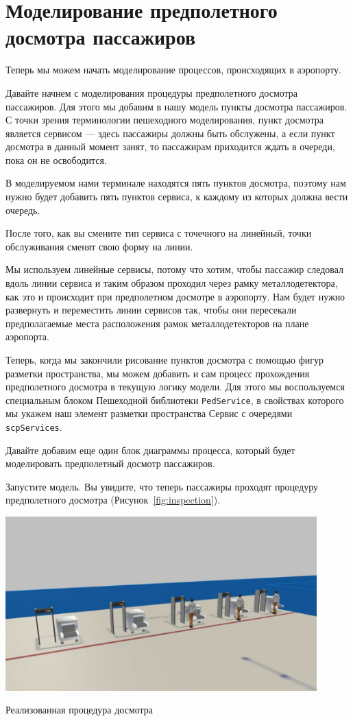 \section{Моделирование предполетного досмотра пассажиров}
Теперь мы можем начать моделирование процессов, происходящих в
аэропорту.\par
Давайте начнем с моделирования процедуры предполетного досмотра
пассажиров. Для этого мы добавим в нашу модель пункты досмотра пассажиров.
С точки зрения терминологии пешеходного моделирования, пункт досмотра
является сервисом --- здесь пассажиры должны быть обслужены, а если пункт
досмотра в данный момент занят, то пассажирам приходится ждать в очереди,
пока он не освободится.\par
В моделируемом нами терминале находятся пять пунктов досмотра, поэтому
нам нужно будет добавить пять пунктов сервиса, к каждому из которых должна
вести очередь.\par
После того, как вы смените тип сервиса с точечного на линейный, точки
обслуживания сменят свою форму на линии.\par
Мы используем линейные сервисы, потому что хотим, чтобы пассажир следовал
вдоль линии сервиса и таким образом проходил через рамку металлодетектора,
как это и происходит при предполетном досмотре в аэропорту. Нам будет нужно
развернуть и переместить линии сервисов так, чтобы они пересекали
предполагаемые места расположения рамок металлодетекторов на плане
аэропорта.\par
Теперь, когда мы закончили рисование пунктов досмотра с помощью фигур
разметки пространства, мы можем добавить и сам процесс прохождения
предполетного досмотра в текущую логику модели. Для этого мы воспользуемся
специальным блоком Пешеходной библиотеки \texttt{PedService}, в свойствах
которого мы укажем наш элемент разметки пространства Сервис с очередями
\texttt{scpServices}.\par
Давайте добавим еще один блок диаграммы процесса, который будет
моделировать предполетный досмотр пассажиров.\par
Запустите модель. Вы увидите, что теперь пассажиры проходят процедуру
предполетного досмотра (Рисунок~\ref{fig:inspection}).

\begin{image}
	\includegraphics[width=0.9\textwidth]{Screenshot from 2023-04-11 14-57-23}
	\caption{Реализованная процедура досмотра}
	\label{fig:inspection}
\end{image}

